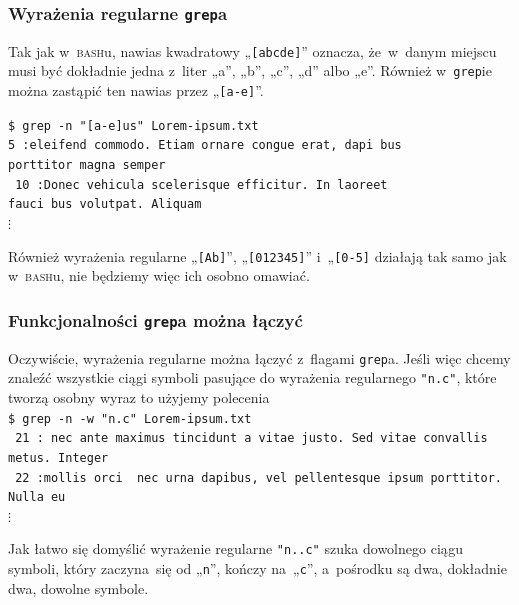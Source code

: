 \documentclass[10pt,t]{beamer}
\begin{document}
\begin{frame}
  \frametitle{Wyrażenia regularne \texttt{grep}a}


  Tak jak w~\textsc{bash}u, nawias kwadratowy „\texttt{[abcde]}” oznacza,
  że~w~danym miejscu musi być \alert{dokładnie jedna} z~liter „a”, „b”,
  „c”, „d” albo „e”. Również w~\texttt{grep}ie można zastąpić ten
  nawias przez „\texttt{[a-e]}”.

  \texttt{\$ grep -n "[a-e]us"{} Lorem-ipsum.txt} \\
  \texttt{{\color{green}5}{\color{jAxisBlue} :}eleifend commodo. Etiam
    ornare congue erat, dapi{\color{red} bus}} \\
  \texttt{porttitor magna semper} \\
  \texttt{{\color{green} 10}{\color{jAxisBlue} :}Donec vehicula scelerisque
    efficitur. In laoreet} \\
  \texttt{fauci{\color{red} bus} volutpat. Aliquam} \\
  \hspace{1em} $\vdots$

  Również wyrażenia regularne „\texttt{[Ab]}”, „\texttt{[012345]}”
  i~„\texttt{[0-5]} działają tak samo jak w~\textsc{bash}u, nie będziemy
  więc ich osobno omawiać.

\end{frame}





\begin{frame}
  \frametitle{Funkcjonalności \texttt{grep}a można łączyć}


  Oczywiście, wyrażenia regularne można łączyć z~flagami \texttt{grep}a.
  Jeśli więc chcemy znaleźć wszystkie ciągi symboli pasujące do wyrażenia
  regularnego \texttt{"n.c"}, które tworzą osobny wyraz to użyjemy
  polecenia \\
  \texttt{\$ grep -n -w "n.c"{} Lorem-ipsum.txt} \\
  \texttt{{\color{green} 21}{\color{jAxisBlue} :}{\color{red} nec} ante
    maximus tincidunt a vitae justo. Sed vitae convallis metus. Integer} \\
  \texttt{{\color{green} 22}{\color{jAxisBlue} :}mollis orci
    {\color{red} nec} urna dapibus, vel pellentesque ipsum porttitor. Nulla
    eu} \\
  \hspace{1em} $\vdots$

  Jak łatwo się domyślić wyrażenie regularne \texttt{"n..c"} szuka dowolnego
  ciągu symboli, który zaczyna~się od „\texttt{n}”, kończy na~„\texttt{c}”,
  a~pośrodku są dwa, dokładnie dwa, dowolne symbole.

\end{frame}
\end{document}
